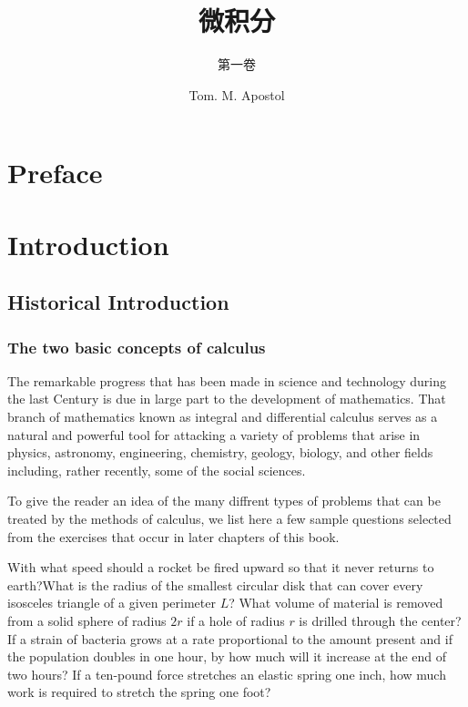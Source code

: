 \documentclass[cn,11pt,chinese]{elegantbook}
\title{微积分}
\subtitle{第一卷}
\author{Tom. M. Apostol}
\numberwithin{equation}{section}
\begin{document}
\maketitle

\chapter*{Preface}


\tableofcontents
\mainmatter
\hypersetup{pageanchor=true}


\chapter{Introduction}
\section{Historical Introduction}

\subsection{The two basic concepts of calculus}
The remarkable progress that has been made in science and technology during the last Century is due in large part to the development of mathematics. That branch of mathematics known as integral and differential calculus serves as a natural and powerful tool for attacking a variety of problems that arise in physics, astronomy, engineering, chemistry, geology, biology, and other fields including, rather recently, some of the social sciences.

To give the reader an idea of the many diffrent types of problems that can be treated by the methods of calculus, we list here a few sample questions selected from the exercises that occur in later chapters of this book.

With what speed should a rocket be fired upward so that it never returns to earth?What is the radius of the smallest circular disk that can cover every isosceles triangle of a given perimeter $L$? What volume of material is removed from a solid sphere of radius $2r$ if a hole of radius $r$ is drilled through the center? If a strain of bacteria grows at a rate proportional to the amount present and if the population doubles in one hour, by how much will it increase at the end of two hours? If a ten-pound force stretches an elastic spring one inch, how much work is required to stretch the spring one foot? 
\end{document}
